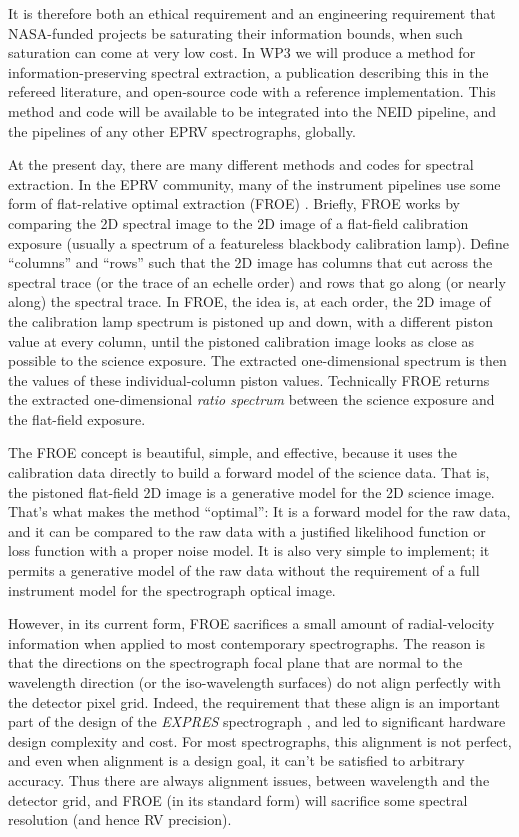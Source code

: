 \documentclass[12pt]{article}
\begin{document}
It is therefore both an ethical requirement and an engineering requirement that NASA-funded projects be saturating their information bounds, when such saturation can come at very low cost.
In WP3 we will produce a method for information-preserving spectral extraction, a publication describing this in the refereed literature, and open-source code with a reference implementation.
This method and code will be available to be integrated into the NEID pipeline, and the pipelines of any other EPRV spectrographs, globally.

At the present day, there are many different methods and codes for spectral extraction.
In the EPRV community, many of the instrument pipelines use some form of flat-relative optimal extraction (FROE) \cite{froe}.
Briefly, FROE works by comparing the 2D spectral image to the 2D image of a flat-field calibration exposure (usually a spectrum of a featureless blackbody calibration lamp).
Define ``columns'' and ``rows'' such that the 2D image has columns that cut across the spectral trace (or the trace of an echelle order) and rows that go along (or nearly along) the spectral trace.
In FROE, the idea is, at each order, the 2D image of the calibration lamp spectrum is pistoned up and down, with a different piston value at every column, until the pistoned calibration image looks as close as possible to the science exposure.
The extracted one-dimensional spectrum is then the values of these individual-column piston values.
Technically FROE returns the extracted one-dimensional \emph{ratio spectrum} between the science exposure and the flat-field exposure.

The FROE concept is beautiful, simple, and effective, because it uses the calibration data directly to build a forward model of the science data.
That is, the pistoned flat-field 2D image is a generative model for the 2D science image.
That's what makes the method ``optimal'': It is a forward model for the raw data, and it can be compared to the raw data with a justified likelihood function or loss function with a proper noise model.
It is also very simple to implement; it permits a generative model of the raw data without the requirement of a full instrument model for the spectrograph optical image.

However, in its current form, FROE sacrifices a small amount of radial-velocity information when applied to most contemporary spectrographs.
The reason is that the directions on the spectrograph focal plane that are normal to the wavelength direction (or the iso-wavelength surfaces) do not align perfectly with the detector pixel grid.
Indeed, the requirement that these align is an important part of the design of the \textsl{EXPRES} spectrograph \cite{expres}, and led to significant hardware design complexity and cost.
For most spectrographs, this alignment is not perfect, and even when alignment is a design goal, it can't be satisfied to arbitrary accuracy.
Thus there are always alignment issues, between wavelength and the detector grid, and FROE (in its standard form) will sacrifice some spectral resolution (and hence RV precision).
\end{document}
